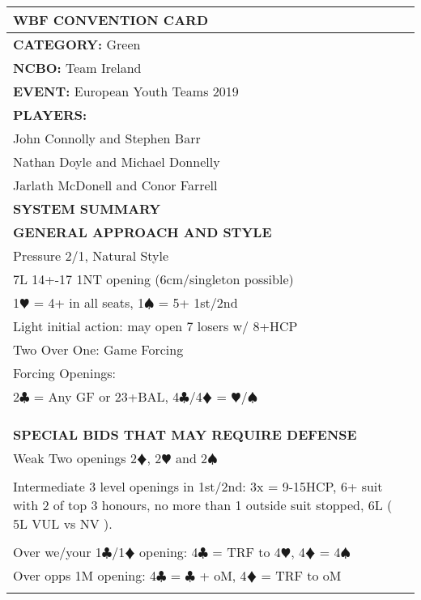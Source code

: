 \documentclass{article}
\newcommand\C{\ensuremath{\clubsuit}}
\newcommand\D{\color{red}\ensuremath{\vardiamondsuit}}
\renewcommand\H{\color{red}\ensuremath{\varheartsuit}}
\renewcommand\S{\ensuremath{\spadesuit}}
\newcommand\N{{\footnotesize NT}}
\begin{document}
\begin{minipage}{5mm}
	\begin{tabular}{| p{5mm} |}
	\end{tabular}
\end{minipage}
\begin{minipage}{90mm}
	\begin{tabular}{| p{88mm} |}
		\hline
		\cellcolor{green!25} \textbf{WBF CONVENTION CARD} \\ \hline
		\textbf{CATEGORY:} Green\\
		\textbf{NCBO:} Team Ireland \\
		\textbf{EVENT:} European Youth Teams 2019\\
		\textbf{PLAYERS:} \\
		John Connolly and Stephen Barr\\
		Nathan Doyle and Michael Donnelly\\ 
		Jarlath McDonell and Conor Farrell
		\multirow{2}{*}{} \\
		\hline \cellcolor{green!25} \textbf{SYSTEM SUMMARY} \\ \hline
		\cellcolor{orange!25}\textbf{GENERAL APPROACH AND STYLE} \\ \hline
		Pressure 2/1, Natural Style\\ \hline
		7L 14+-17 1{\N} opening (6cm/singleton possible)\\ \hline
		1{\H} = 4+ in all seats, 1{\S} = 5+ 1st/2nd\\ \hline
		Light initial action: may open 7 losers w/ 8+HCP\\ \hline
		Two Over One: Game Forcing\\ \hline
		Forcing Openings:\\ \hline
		{2\C} = Any GF or 23+BAL, 4{\C}/4{\D} = {\H}/{\S} \\ \hline
		\\ \hline
		\\ \hline
		\\ \hline
		\cellcolor{orange!25}\textbf{SPECIAL BIDS THAT MAY REQUIRE DEFENSE} \\ \hline
		Weak Two openings 2{\D}, 2{\H} and 2{\S}\\ \hline
		\\ \hline
		Intermediate 3 level openings in 1st/2nd: 
		3x = 9-15HCP, 6+ suit with 2 of top 3 honours,
		no more than 1 outside suit stopped, 6L ( 5L VUL vs NV ).\\ \hline
		\\ \hline
		Over we/your 1{\C}/1{\D} opening: 4{\C} = TRF to 4{\H}, 4{\D} = 4{\S} \\ \hline
		Over opps 1M opening: 4{\C} = {\C} + oM, 4{\D} = TRF to oM\\ \hline
		\\ \hline


\end{tabular}
\end{minipage}
\end{document}

